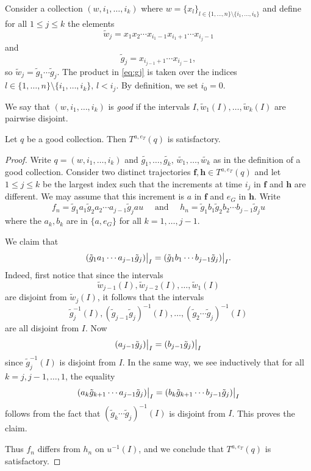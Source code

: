Consider a collection $(w, i_1, \ldots, i_k)$ where $w = \{x_l\}_{l \in \{1,\ldots, n\}\setminus \{i_1,\ldots, i_k\}}$ and define for all $1 \leq j \leq k$ the elements
\begin{equation}\label{eq:gj}
\tilde{w}_j = x_1x_2 \cdots x_{i_1 - 1} x_{i_1 + 1} \cdots x_{i_j-1}
\end{equation}
and 
\[
\tilde{g}_j = x_{i_{j-1}+ 1} \cdots x_{i_j - 1}, 
\]so $\tilde{w}_j = \tilde{g}_1\cdots \tilde{g}_j$. 
The product in \eqref{eq:gj} is taken over the indices $l  \in \{1,\ldots, n\}\setminus \{i_1,\ldots, i_k\},\, l < i_j$. By definition, we set $i_0 = 0$.

We say that $(w, i_1, \ldots, i_k)$ is \emph{good} if the intervals $I, \tilde{w}_1(I),\ldots, \tilde{w}_k(I)$ are pairwise disjoint.
\begin{proposition}
    Let $q$ be a good collection. Then $T^{a, e_T}(q)$ is satisfactory.
\end{proposition}
\begin{proof}
    Write $q = (w, i_1, \ldots, i_k)$ and $\tilde{g_1},\ldots, \tilde{g_k},\, \tilde{w_1},\ldots, \tilde{w_k}$ %
    as in the definition of a good collection. Consider two distinct trajectories $\mathbf{f}, \mathbf{h} \in T^{a,e_T}(q)$ and let $1\leq j \leq k$ be the largest index such that the increments at time $i_j$ in $\mathbf{f}$ and $\mathbf{h}$ are different. We may assume that this increment is $a$ in $\mathbf{f}$ and $e_G$ in $\mathbf{h}$. Write
    \[
    f_n = \tilde{g}_1 a_1 \tilde{g}_2 a_2 \cdots a_{j-1}\tilde{g}_j a u \quad \text{ and } \quad h_n = \tilde{g}_1 b_1\tilde{g}_2 b_2 \cdots b_{j-1} \tilde{g}_j u
    \]where the $a_k, b_k$ are in $\{a, e_G\}$ for all $k = 1,\ldots, j-1$. 
    
    We claim that
    \[
    \restr{(\tilde{g}_1 a_1 \cdots a_{j-1}\tilde{g}_j)}{I} = \restr{(\tilde{g}_1b_1  \cdots b_{j-1}\tilde{g}_j)}{I}.
    \] Indeed, first notice that since the intervals \[
    \tilde{w}_{j-1}(I), \tilde{w}_{j-2}(I),\ldots, \tilde{w}_1(I)
    \]are disjoint from $\tilde{w}_j(I)$, it follows that the intervals
    \[
    \tilde{g}_j^{-1}(I), (\tilde{g}_{j-1}\tilde{g}_j)^{-1}(I),\ldots, (\tilde{g}_2\cdots \tilde{g}_j)^{-1}(I)
    \]are all disjoint from $I$. Now
    \[
    \restr{(a_{j-1}\tilde{g}_j)}{I} = \restr{(b_{j-1}\tilde{g}_j)}{I}
    \] since $\tilde{g}_j^{-1}(I)$ is disjoint from $I$. In the same way, we see inductively that for all $k = j, j-1,\ldots, 1$, the equality
    \[
     \restr{(a_k \tilde{g}_{k+1} \cdots a_{j-1}\tilde{g}_j)}{I} = \restr{(b_k \tilde{g}_{k+1}\cdots b_{j-1}\tilde{g}_j)}{I}
    \]follows from the fact that $(\tilde{g}_k \cdots \tilde{g}_j)^{-1}(I)$ is disjoint from $I$. This proves the claim.

    Thus $f_n$ differs from $h_n$ on $u^{-1}(I)$, and we conclude that $T^{a, e_T}(q)$ is satisfactory. 
\end{proof}

